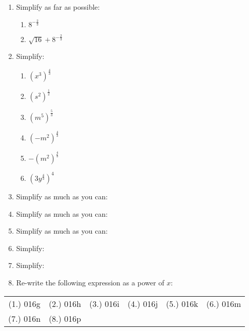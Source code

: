 \begin{eocexercises}{}
\begin{enumerate}
\item{Simplify as far as possible:
\begin{enumerate}
\item{$8^{-\frac{2}{3}}$}
\item{$\sqrt{16}+8^{-\frac{2}{3}}$}
\end{enumerate}}
\item{Simplify:
\begin{multicols}{2}
\begin{enumerate}[label=\textbf{\alph*}.]
 \item  $(x^3)^\frac{4}{3}$
\item $(s^2)^\frac{1}{2}$
\item $(m^5)^\frac{5}{3}$
\item $(-m^2)^\frac{4}{3}$
\item $-(m^2)^\frac{4}{3}$
\item  $(3y^\frac{4}{3})^4$
\end{enumerate}
\end{multicols}
}

\item{Simplify as much as you can:
}

\item{Simplify as much as you can:
}

\item{Simplify as much as you can:
}
 \item{Simplify:
}

\item{Simplify:
}

\item{Re-write the following expression as a power of $x$:
}

\end{enumerate}



\par \practiceinfo
\par \begin{tabular}[h]{cccccc}
(1.)	016g	&
(2.)	016h	&
(3.)	016i	&
(4.)	016j	&
(5.)	016k	&
(6.)	016m	\\ %
(7.)	016n	&
(8.)	016p	&
\end{tabular}
\end{eocexercises} 




